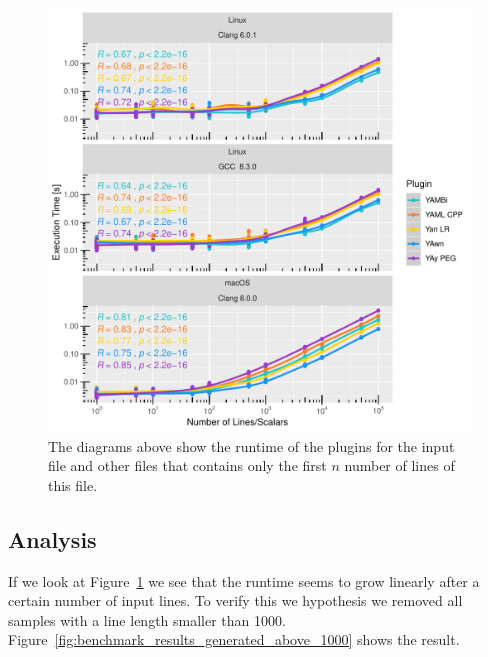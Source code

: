 \begin{figure}[H]
  \centering
    \includegraphics[width=\textwidth]{Figures/BenchmarkResultGenerated}
  \caption{The diagrams above show the runtime of the plugins for the input file \FileGeneratedHundredThousand{} and other files that contains only the first $n$ number of lines of this file.}
  \label{fig:benchmark_results_generated}
\end{figure}

\subsection{Analysis}

If we look at Figure~\ref{fig:benchmark_results_generated} we see that the runtime seems to grow linearly after a certain number of input lines. To verify this we hypothesis we removed all samples with a line length smaller than 1000. Figure~\ref{fig:benchmark_results_generated_above_1000} shows the result.

